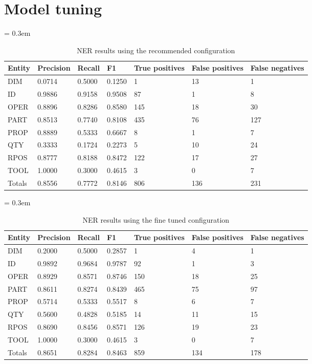\section{Model tuning}\label{sec:model-tuning}


\begin{table}[ht]
	\caption{NER results using the recommended configuration}
	\tabulinesep = 0.3em
	\setlength{\tabcolsep}{0.2em}
	\centering
	\begin{tabu} { X[c,m] X[r,m] X[r,m] X[r,m] X[r,m] X[r,m] X[r,m] }
		\rowfont{\bfseries\itshape} Entity & Precision & Recall & F1 & True positives & False positives & False negatives \\
		\hline
		DIM & 0.0714 & 0.5000 & 0.1250 & 1 & 13 & 1 \\
		ID & 0.9886 & 0.9158 & 0.9508 & 87 & 1 & 8 \\
		OPER & 0.8896 & 0.8286 & 0.8580 & 145 & 18 & 30 \\
		PART & 0.8513 & 0.7740 & 0.8108 & 435 & 76 & 127 \\
		PROP & 0.8889 & 0.5333 & 0.6667 & 8 & 1 & 7 \\
		QTY & 0.3333 & 0.1724 & 0.2273 & 5 & 10 & 24 \\
		RPOS & 0.8777 & 0.8188 & 0.8472 & 122 & 17 & 27 \\
		TOOL & 1.0000 & 0.3000 & 0.4615 & 3 & 0 & 7 \\
		\rowfont{\bfseries} Totals & 0.8556 & 0.7772 & 0.8146 & 806 & 136 & 231 \\
	\end{tabu}
	\label{tab:results_recommended-configuration}
\end{table}


\begin{table}[ht]
	\caption{NER results using the fine tuned configuration}
	\tabulinesep = 0.3em
	\setlength{\tabcolsep}{0.2em}
	\centering
	\begin{tabu} { X[c,m] X[r,m] X[r,m] X[r,m] X[r,m] X[r,m] X[r,m] }
		\rowfont{\bfseries\itshape} Entity & Precision & Recall & F1 & True positives & False positives & False negatives \\
		\hline
		DIM & 0.2000 & 0.5000 & 0.2857 & 1 & 4 & 1 \\
		ID & 0.9892 & 0.9684 & 0.9787 & 92 & 1 & 3 \\
		OPER & 0.8929 & 0.8571 & 0.8746 & 150 & 18 & 25 \\
		PART & 0.8611 & 0.8274 & 0.8439 & 465 & 75 & 97 \\
		PROP & 0.5714 & 0.5333 & 0.5517 & 8 & 6 & 7 \\
		QTY & 0.5600 & 0.4828 & 0.5185 & 14 & 11 & 15 \\
		RPOS & 0.8690 & 0.8456 & 0.8571 & 126 & 19 & 23 \\
		TOOL & 1.0000 & 0.3000 & 0.4615 & 3 & 0 & 7 \\
		\rowfont{\bfseries} Totals & 0.8651 & 0.8284 & 0.8463 & 859 & 134 & 178 \\
	\end{tabu}
	\label{tab:results_optimal-configuration}
\end{table}
